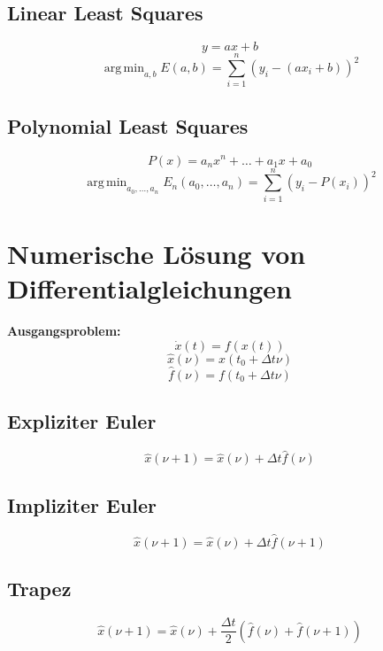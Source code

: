 \documentclass[german]{latex4ei/latex4ei_fs}
\DeclareMathOperator*{\argmin}{arg\,min}
\begin{document}
\begin{sectionbox}
\subsection{Linear Least Squares}
\begin{equation*}
	y = a x + b
\end{equation*}
\begin{equation*}
	\argmin_{a, b} E(a, b) = \sum_{i = 1}^n \left( y_i - (a x_i + b) \right)^2
\end{equation*}

\subsection{Polynomial Least Squares}
\begin{equation*}
	P(x) = a_n x^n + \ldots + a_1 x + a_0
\end{equation*}
\begin{equation*}
	\argmin_{a_0, \ldots, a_n} E_n(a_0, \ldots, a_n) = \sum_{i = 1}^n \left( y_i - P(x_i) \right)^2
\end{equation*}
\end{sectionbox}

\section{Numerische Lösung von Differentialgleichungen}
\begin{sectionbox}
\textbf{Ausgangsproblem:}
\begin{equation*}
	\dot{x}(t) = f(x(t))
\end{equation*}
\begin{equation*}
	\hat{x}(\nu) = x(t_0 + \Delta t \nu)
\end{equation*}
\begin{equation*}
	\hat{f}(\nu) = f(t_0 + \Delta t \nu)
\end{equation*}

\subsection{Expliziter Euler}
\begin{equation*}
	\hat{x}(\nu + 1) = \hat{x}(\nu) + \Delta t \hat{f}(\nu)
\end{equation*}

\subsection{Impliziter Euler}
\begin{equation*}
	\hat{x}(\nu + 1) = \hat{x}(\nu) + \Delta t \hat{f}(\nu + 1)
\end{equation*}

\subsection{Trapez}
\begin{equation*}
	\hat{x}(\nu + 1) = \hat{x}(\nu) + \frac{\Delta t}{2} (\hat{f}(\nu) + \hat{f}(\nu + 1))
\end{equation*}
\end{sectionbox}
\end{document}
